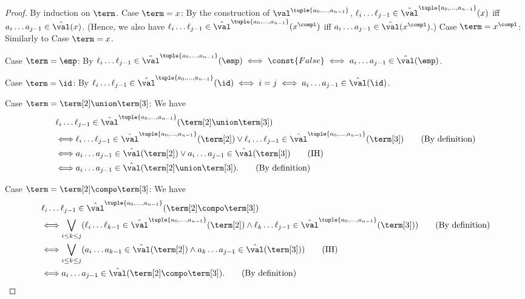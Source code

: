 \begin{proof}
    By induction on $\term$.
    Case $\term = x$:
    By the construction of $\val^{\tuple{a_0, \dots, a_{n-1}}}$,
    $\ell_{i} \dots \ell_{j-1} \in \hat{\val}^{\tuple{a_0, \dots, a_{n-1}}}(x)$ iff $a_{i}\dots a_{j-1} \in \hat{\val}(x)$.
    (Hence, we also have $\ell_{i} \dots \ell_{j-1} \in \hat{\val}^{\tuple{a_0, \dots, a_{n-1}}}(x^{\compl})$ iff $a_{i} \dots a_{j-1} \in \hat{\val}(x^{\compl})$.)
    Case $\term = x^{\compl}$:
    Similarly to Case $\term = x$.

    Case $\term = \emp$:
    By $\ell_{i} \dots \ell_{j-1} \in \hat{\val}^{\tuple{a_0, \dots, a_{n-1}}}(\emp) \iff \const{False} \iff  a_{i} \dots a_{j-1} \in \hat{\val}(\emp)$.

    Case $\term = \id$:
    By $\ell_{i} \dots \ell_{j-1} \in \hat{\val}^{\tuple{a_0, \dots, a_{n-1}}}(\id) \iff i = j \iff  a_{i} \dots a_{j-1} \in \hat{\val}(\id)$.

    Case $\term = \term[2] \union \term[3]$:
    We have
    \begin{align*}
         & \ell_{i} \dots \ell_{j-1} \in \hat{\val}^{\tuple{a_0, \dots, a_{n-1}}}(\term[2] \union \term[3])                                                                                                               \\
         & \Longleftrightarrow \ell_{i} \dots \ell_{j-1} \in \hat{\val}^{\tuple{a_0, \dots, a_{n-1}}}(\term[2]) \lor \ell_{i} \dots \ell_{j-1} \in \hat{\val}^{\tuple{a_0, \dots, a_{n-1}}}(\term[3]) \tag{By definition} \\
         & \Longleftrightarrow a_{i} \dots a_{j-1} \in \hat{\val}(\term[2]) \lor a_{i} \dots a_{j-1} \in \hat{\val}(\term[3]) \tag{IH}                                                                                    \\
         & \Longleftrightarrow a_{i} \dots a_{j-1} \in \hat{\val}(\term[2] \union \term[3]). \tag{By definition}
    \end{align*}

    Case $\term = \term[2] \compo \term[3]$:
    We have
    \begin{align*}
         & \ell_{i} \dots \ell_{j-1} \in \hat{\val}^{\tuple{a_0, \dots, a_{n-1}}}(\term[2] \compo \term[3])                                                                                                                                          \\
         & \Longleftrightarrow \bigvee_{i \le k \le j} (\ell_{i} \dots \ell_{k-1} \in \hat{\val}^{\tuple{a_0, \dots, a_{n-1}}}(\term[2]) \land \ell_{k} \dots \ell_{j-1} \in \hat{\val}^{\tuple{a_0, \dots, a_{n-1}}}(\term[3])) \tag{By definition} \\
         & \Longleftrightarrow \bigvee_{i \le k \le j} (a_{i} \dots a_{k-1} \in \hat{\val}(\term[2]) \land a_{k} \dots a_{j-1} \in \hat{\val}(\term[3])) \tag{IH}                                                                                    \\
         & \Longleftrightarrow a_{i} \dots a_{j-1} \in \hat{\val}(\term[2] \compo \term[3]). \tag{By definition}
    \end{align*}


\end{proof}
